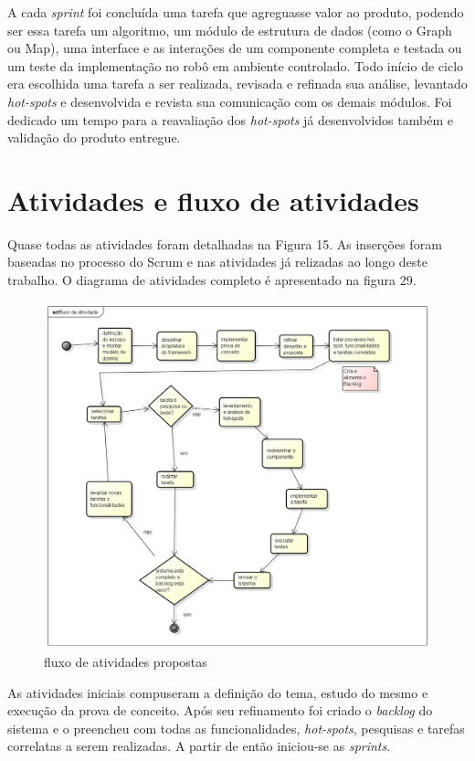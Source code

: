 A cada \textit{sprint} foi concluída uma tarefa que agreguasse valor ao produto, podendo ser essa tarefa um algoritmo, um módulo de estrutura de dados (como o Graph ou Map), uma interface e as interações de um componente completa e testada ou um teste da implementação no robô em ambiente controlado. Todo início de ciclo era escolhida uma tarefa a ser realizada, revisada e refinada sua análise, levantado \textit{hot-spots} e desenvolvida e revista sua comunicação com os demais módulos. Foi dedicado um tempo para a reavaliação dos \textit{hot-spots} já desenvolvidos também e validação do produto entregue.

\section{Atividades e fluxo de atividades}

Quase todas as atividades foram detalhadas na Figura 15. As inserções foram baseadas no processo do Scrum e nas atividades já relizadas ao longo deste trabalho. O diagrama de atividades completo é apresentado na figura 29.

\begin{figure}[h]
	\centering
	\label{fig29}
		\includegraphics[keepaspectratio=true,scale=0.4]{figuras/fluxoatvd.png}
	\caption{fluxo de atividades propostas}
\end{figure}

As atividades iniciais compuseram a definição do tema, estudo do mesmo e execução da prova de conceito. Após seu refinamento foi criado o \textit{backlog} do sistema e o preencheu com todas as funcionalidades, \textit{hot-spots}, pesquisas e tarefas correlatas a serem realizadas. A partir de então iniciou-se as \textit{sprints}.

